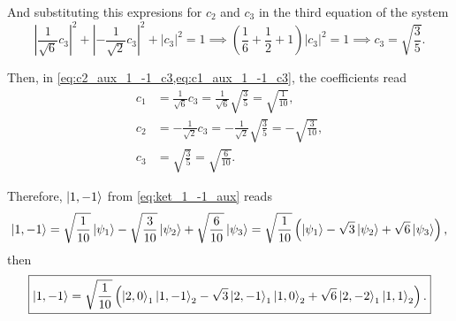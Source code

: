 And substituting this expresions for $c_2$ and $c_3$ in the third equation of the system 
\begin{equation}
    \left|
    \frac{1}{\sqrt{6}} c_3
    \right|^2
    +
    \left|
    -\frac{1}{\sqrt{2}} c_3
    \right|^2
    +
    \left|
    c_3
    \right|^2
    = 1
    \implies
    \left( \frac{1}{6} + \frac{1}{2} + 1 \right) \left| c_3 \right|^2 = 1
    \implies
    c_3 = \sqrt{\frac{3}{5}}.
\end{equation}

Then, in \cref{eq:c2_aux_1_-1_c3,eq:c1_aux_1_-1_c3}, the coefficients read 
\begin{align}
        c_1 &= \frac{1}{\sqrt{6}} c_3 = \frac{1}{\sqrt{6}} \sqrt{\frac{3}{5}} = \sqrt{\frac{1}{10}}, \\
        c_2 &= -\frac{1}{\sqrt{2}} c_3 = -\frac{1}{\sqrt{2}} \sqrt{\frac{3}{5}} = -\sqrt{\frac{3}{10}}, \\
        c_3 &= \sqrt{\frac{3}{5}} = \sqrt{\frac{6}{10}}.
\end{align}

Therefore, $\Ket{1,-1}$ from \cref{eq:ket_1_-1_aux} reads 
\begin{equation}
    \Ket{1,-1} =
    \sqrt{\frac{1}{10}} \Ket{\psi_1} - \sqrt{\frac{3}{10}} \Ket{\psi_2} + \sqrt{\frac{6}{10}} \Ket{\psi_3} = 
    \sqrt{\frac{1}{10}} \left( \Ket{\psi_1} - \sqrt{3} \Ket{\psi_2} + \sqrt{6} \Ket{\psi_3}  \right),
\end{equation}
then
\begin{equation}
    \boxed{
        \Ket{1,-1} =
        \sqrt{\frac{1}{10}} \left( \Ket{2,0}_1 \Ket{1,-1}_2 - \sqrt{3} \Ket{2,-1}_1 \Ket{1,0}_2 + \sqrt{6} \Ket{2,-2}_1 \Ket{1,1}_2  \right).
    }
\end{equation}

\newpage
